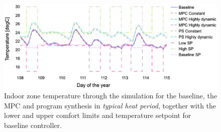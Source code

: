 \begin{figure}
  \includegraphics[scale=.4]{images/boptest/Fig7.eps}
\caption{Indoor zone temperature through the simulation for the baseline, the MPC and program synthesis in \emph{typical heat period}, together with the lower and upper comfort limits and temperature setpoint for baseline controller.}
\label{fig:temp-typical}       %
\end{figure}